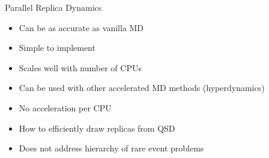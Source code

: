 \documentclass[onlymath]{beamer}
\begin{document}
\begin{frame}{Parallel Replica Dynamics}


  \begin{tcolorbox}[title=Pros,colback=white,colframe=green!50!black,]
    \begin{itemize}
      \item Can be as accurate as vanilla MD
      \item Simple to implement
      \item Scales well with number of CPUs
      \item Can be used with other accelerated MD methods (hyperdynamics)
    \end{itemize}
  \end{tcolorbox}

  \vspace{2mm}

  \begin{tcolorbox}[title=Cons,colback=white,colframe=red!50!black,]
    \begin{itemize}
      \item No acceleration per CPU
      \item How to efficiently draw replicas from QSD
      \item Does not address hierarchy of rare event problems
    \end{itemize}
  \end{tcolorbox}

\end{frame}
\end{document}
